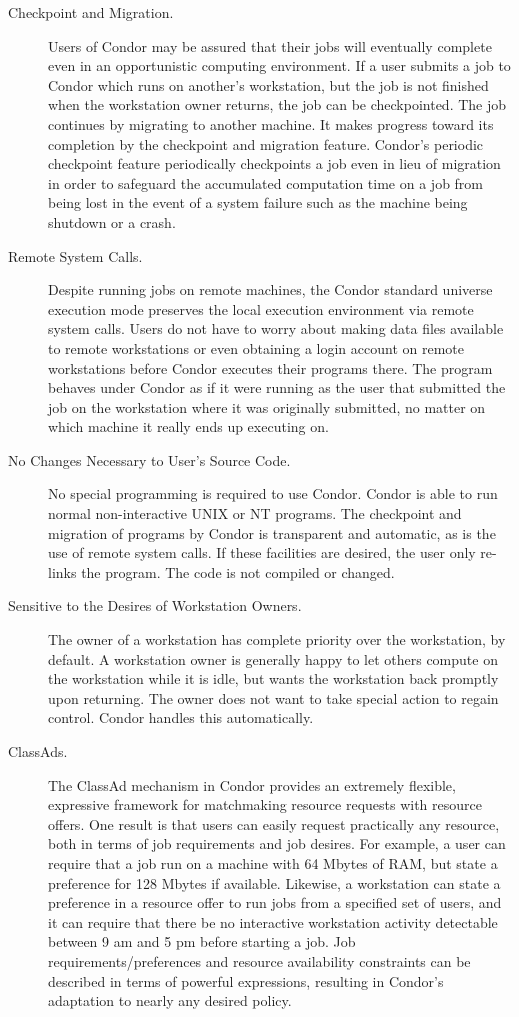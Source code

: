 \begin{description}
	\item[Checkpoint and Migration.] Users of Condor may be assured that
their jobs will eventually complete even in an opportunistic computing
environment. If a user submits a job to Condor which runs on another's
workstation, but the job is not finished when the workstation
owner returns, the job can be checkpointed.
The job continues
by migrating 
to another machine. It makes progress toward
its completion by the checkpoint and migration feature.
Condor's periodic checkpoint feature 
periodically checkpoints a job even in lieu of migration in order to
safeguard the accumulated computation time on a job from being lost in the
event of a system failure such as the machine being shutdown or a crash.
	\item[Remote System Calls.] 
Despite running jobs on remote machines,
the Condor standard universe execution
mode preserves the local execution environment
via remote system calls. Users do not have to worry
about making data files available to remote workstations or even
obtaining a login account on remote workstations before Condor executes
their programs there. The program behaves under Condor as if it were
running as the user that submitted the job on the workstation where it
was originally submitted, no matter on which machine it really ends up
executing on.
	\item[No Changes Necessary to User's Source Code.] No special
programming is required to use Condor. Condor is able to run normal
non-interactive UNIX or NT programs.  The checkpoint and migration of
programs by Condor is transparent and automatic, as is the use of
remote system calls.  If these facilities are desired, the user only
re-links the program.  The code is not compiled or changed.
	\item[Sensitive to the Desires of Workstation Owners.] The
owner of a
workstation has complete priority over the workstation,
by default.
A workstation owner is generally happy to let others compute on
the workstation while it is idle, but wants the workstation back
promptly upon returning. The owner does not want to take special
action to regain control. Condor handles this automatically. 
	\item[ClassAds.]The ClassAd mechanism 
in Condor provides an extremely
flexible, expressive framework for matchmaking
resource requests with resource offers. One result is that users can
easily request practically any resource, both in terms of job
requirements and job desires.
For example, a user can require that a job run on a machine
with 64 Mbytes of RAM,
but state a preference for 128 Mbytes if available.
Likewise, a workstation
can state a preference in a resource offer to run jobs
from a specified set of users, and it can require that there be
no interactive workstation
activity detectable between 9 am and 5 pm before starting a job.
Job requirements/preferences and resource availability constraints can be
described in terms of powerful expressions, resulting in
Condor's adaptation to nearly any desired policy. 
\end{description}
